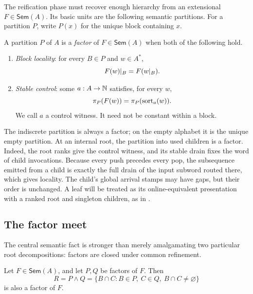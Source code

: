 The reification phase must recover enough hierarchy from an extensional
\(F\in\mathsf{Sem}(A)\).  Its basic units are the following semantic
partitions.  For a partition \(P\), write \(P(x)\) for the unique block
containing \(x\).

\begin{definition}
\label{def:nbe-factor}
A partition \(P\) of \(A\) is a \emph{factor} of \(F\in\mathsf{Sem}(A)\) when
both of the following hold.
\begin{enumerate}
\item \emph{Block locality}: for every \(B\in P\) and \(w\in A^*\),
\begin{equation}
  F(w)\mathord{|}_{B}=F(w\mathord{|}_{B}).
  \label{eq:factor-locality}
\end{equation}
\item \emph{Stable control}: some \(a:A\to\mathbb{N}\) satisfies, for every \(w\),
\begin{equation}
  \pi_{P}(F(w))=\pi_{P}(\operatorname{sort}_a(w)).
  \label{eq:factor-control}
\end{equation}
We call \(a\) a control witness.  It need not be constant within a block.
\end{enumerate}
\end{definition}

The indiscrete partition is always a factor; on the empty alphabet it is the
unique empty partition.  At an internal root, the partition into used children
is a factor.  Indeed, the root ranks give the control witness, and its stable
drain fixes the word of child invocations.  Because every push precedes every
pop, the subsequence emitted from a child is exactly the full drain of the
input subword routed there, which gives locality.  The child's global arrival
stamps may have gaps, but their order is unchanged.  A leaf will be treated as
its online-equivalent presentation with a ranked root and singleton children,
as in .

\subsection{The factor meet}

The central semantic fact is stronger than merely amalgamating two particular
root decompositions: factors are closed under common refinement.

\begin{lemma}
\label{lem:factor-meet}
Let \(F\in\mathsf{Sem}(A)\), and let \(P,Q\) be factors of \(F\).  Then
\begin{equation}
 R=P\wedge Q
   =\{B\cap C:B\in P,\ C\in Q,\ B\cap C\ne\varnothing\}
 \label{eq:factor-meet}
\end{equation}
is also a factor of \(F\).
\end{lemma}

